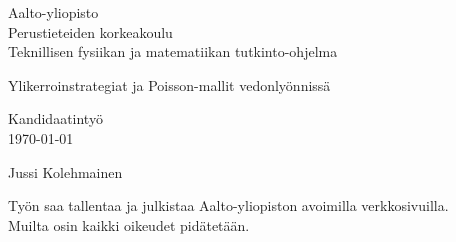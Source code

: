\documentclass[a4paper,finnish,titlepage,12pt]{article}
\begin{document}
\ifpdf
{}
\else
{}
\fi

\pagestyle{empty} %

\begin{titlepage}
	Aalto-yliopisto \\
	Perustieteiden korkeakoulu \\
	Teknillisen fysiikan ja matematiikan tutkinto-ohjelma \\
	
	\vfill
	
	\begin{center}
		{\LARGE Ylikerroinstrategiat ja Poisson-mallit vedonlyönnissä}
		
		Kandidaatintyö \\
		\today

		\vspace{3cm}

		{\large Jussi Kolehmainen}

	\end{center}

	\vfill

	Työn saa tallentaa ja julkistaa Aalto-yliopiston avoimilla verkkosivuilla. \\
	Muilta osin kaikki oikeudet pidätetään.
\end{titlepage}

%
%



\tableofcontents
\newpage
\end{document}

